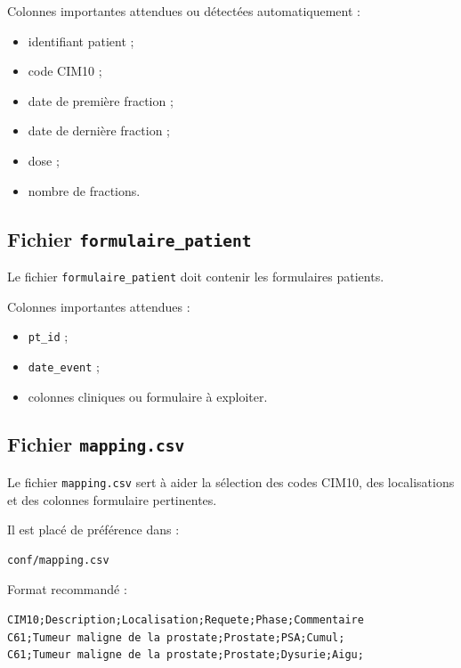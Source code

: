 \documentclass[11pt,a4paper]{article}
\begin{document}
Colonnes importantes attendues ou détectées automatiquement :

\begin{itemize}
    \item identifiant patient ;
    \item code CIM10 ;
    \item date de première fraction ;
    \item date de dernière fraction ;
    \item dose ;
    \item nombre de fractions.
\end{itemize}

\subsection{Fichier \texttt{formulaire\_patient}}

Le fichier \texttt{formulaire\_patient} doit contenir les formulaires patients.

Colonnes importantes attendues :

\begin{itemize}
    \item \texttt{pt\_id} ;
    \item \texttt{date\_event} ;
    \item colonnes cliniques ou formulaire à exploiter.
\end{itemize}

\subsection{Fichier \texttt{mapping.csv}}

Le fichier \texttt{mapping.csv} sert à aider la sélection des codes CIM10, des
localisations et des colonnes formulaire pertinentes.

Il est placé de préférence dans :

\begin{lstlisting}
conf/mapping.csv
\end{lstlisting}

Format recommandé :

\begin{lstlisting}
CIM10;Description;Localisation;Requete;Phase;Commentaire
C61;Tumeur maligne de la prostate;Prostate;PSA;Cumul;
C61;Tumeur maligne de la prostate;Prostate;Dysurie;Aigu;
\end{lstlisting}

\end{document}
